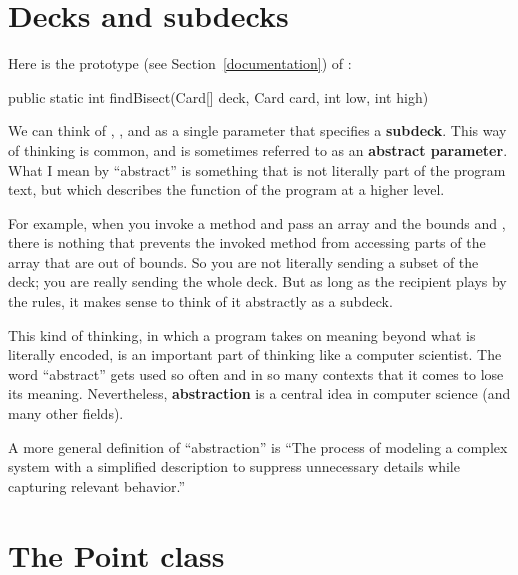 \section{Decks and subdecks}

Here is the prototype (see Section~\ref{documentation}) of :

\begin{code}
public static int findBisect(Card[] deck, Card card, int low, int high)
\end{code}


We can think of , , and  as a single parameter that specifies a {\bf subdeck}.
This way of thinking is common, and is sometimes referred to as an {\bf abstract parameter}.
What I mean by ``abstract'' is something that is not literally part of the program text, but which describes the function of the program at a higher level.

For example, when you invoke a method and pass an array and the bounds  and , there is nothing that prevents the invoked method from accessing parts of the array that are out of bounds.
So you are not literally sending a subset of the deck; you are really sending the whole deck.
But as long as the recipient plays by the rules, it makes sense to think of it abstractly as a subdeck.

This kind of thinking, in which a program takes on meaning beyond what is literally encoded, is an important part of thinking like a computer scientist.
The word ``abstract'' gets used so often and in so many contexts that it comes to lose its meaning.
Nevertheless, {\bf abstraction} is a central idea in computer science (and many other fields).


A more general definition of ``abstraction'' is ``The process of modeling a complex system with a simplified description to suppress unnecessary details while capturing relevant behavior.''




\section{The Point class}

